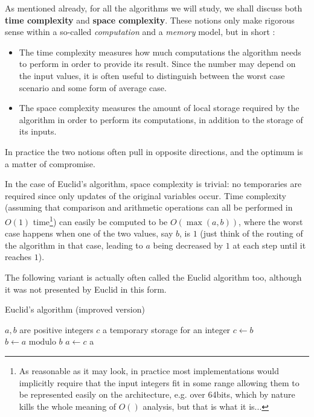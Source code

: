 \documentclass[12pt]{article}
\theoremstyle{plain}
\theoremstyle{remark}
\begin{document}
As mentioned already, for all the algorithms we will study, we shall discuss both {\bf
time complexity} and {\bf space complexity}. These notions only make rigorous 
sense within a so-called {\it computation} and a {\it memory} model, but in short :
\begin{itemize}
\item The time complexity measures how much computations the algorithm
needs to perform in order to provide its result. Since the number may
depend on the input values, it is often useful to distinguish between
the worst case scenario and some form of average case.
\item The space complexity measures the amount of local storage required by
the algorithm in order to perform its computations, in addition to the storage
of its inputs.
\end{itemize}

In practice the two notions often pull in opposite directions, and the optimum 
is a matter of compromise.

\medskip

In the case of Euclid's algorithm, space complexity is trivial: no temporaries
are required since only updates of the original variables occur. Time complexity
(assuming that comparison and arithmetic operations can all be performed in
$O(1)$ time\footnote{As reasonable as it may look, in practice most
implementations would implicitly require that the input integers fit in some range
allowing them to be represented easily on the architecture, e.g. over 64bits, 
which by nature kills the whole meaning of $O()$ analysis, but that is what it
is...}) can easily be computed to be $O(\max(a, b))$, where the worst case
happens when one of the two values, say $b$, is $1$ (just think of the routing of the algorithm
in that case, leading to $a$ being decreased by $1$ at each step until it
reaches $1$). 

\medskip

The following variant is actually often called the Euclid algorithm too, 
although it was not presented by Euclid in this form.

\begin{algorithm}[H]
\caption{Euclid's algorithm (improved version)}
\begin{algorithmic}
\Require $a, b$ are positive integers
\Require $c$ a temporary storage for an integer
\State $c \gets b$ 
\State $b \gets a \textrm{ modulo } b$
\State $a \gets c$
\EndWhile
\State \Return a
\EndFunction
\end{algorithmic}
\end{algorithm}
\end{document}
